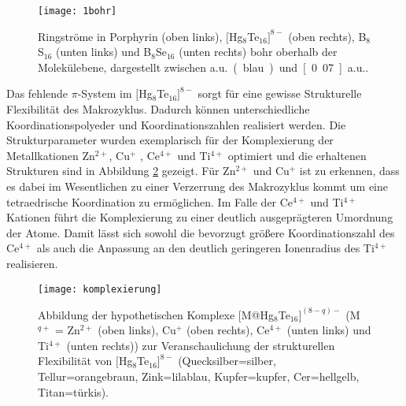 

\begin{figure}[ht!]
	\centering
	\texttt{[image: 1bohr]}
	\captionsetup{figurewithin = chapter}
	\captionsetup{font=small, labelfont=bf}\caption[{Ringströme in Porphyrin, $[$Hg$_8$Te$_{16}]^{8-}$, B$_8$S$_{16}$ und B$_8$Se$_{16}$}]{Ringströme in Porphyrin (oben links), $[$Hg$_8$Te$_{16}]^{8-}$ (oben rechts), B$_8$S$_{16}$ (unten links) und B$_8$Se$_{16}$ (unten rechts) \unit[1]{bohr} oberhalb der Molekülebene, dargestellt zwischen \unit[0]{a.u.} (blau) und \unit[0.07]{a.u.}.}
\label{abb:lic}
\end{figure}

\FloatBarrier
Das fehlende $\pi$-System im $[$Hg$_8$Te$_{16}]^{8-}$ sorgt für eine gewisse Strukturelle Flexibilität des Makrozyklus. Dadurch können unterschiedliche Koordinationspolyeder und Koordinationszahlen realisiert werden. Die Strukturparameter wurden exemplarisch für der Komplexierung der Metallkationen Zn$^{2+}$, Cu$^+$ , Ce$^{4+}$ und Ti$^{4+}$ optimiert und die erhaltenen Strukturen sind in Abbildung \ref{abb:komplexierung} gezeigt. Für Zn$^{2+}$ und Cu$^+$ ist zu erkennen, dass es dabei im Wesentlichen zu einer Verzerrung des Makrozyklus kommt um eine tetraedrische Koordination zu ermöglichen. Im Falle der Ce$^{4+}$ und Ti$^{4+}$ Kationen führt die Komplexierung zu einer deutlich ausgeprägteren Umordnung der Atome. Damit lässt sich sowohl die bevorzugt größere Koordinationszahl des Ce$^{4+}$ als auch die Anpassung an den deutlich geringeren Ionenradius des Ti$^{4+}$ realisieren.

\begin{figure}[ht!]
	\centering
	\texttt{[image: komplexierung]}
	\captionsetup{figurewithin = chapter}
	\captionsetup{font=small, labelfont=bf}\caption[{Abbildungen der hypothetischen Komplexe [M@Hg$_8$Te$_{16}]^{(8-q)-}$ (M$^{q+}$ = Zn$^{2+}$, Cu$^+$ , Ce$^{4+}$ und Ti$^{4+}$)}]{{Abbildung der hypothetischen Komplexe [M@Hg$_8$Te$_{16}]^{(8-q)-}$ (M$^{q+}$ = Zn$^{2+}$ (oben links), Cu$^+$ (oben rechts), Ce$^{4+}$ (unten links) und Ti$^{4+}$ (unten rechts))} zur Veranschaulichung der strukturellen Flexibilität von $[$Hg$_8$Te$_{16}]^{8-}$ (Quecksilber=silber, Tellur=orangebraun, Zink=lilablau, Kupfer=kupfer, Cer=hellgelb, Titan=türkis). }
\label{abb:komplexierung}
\end{figure}

